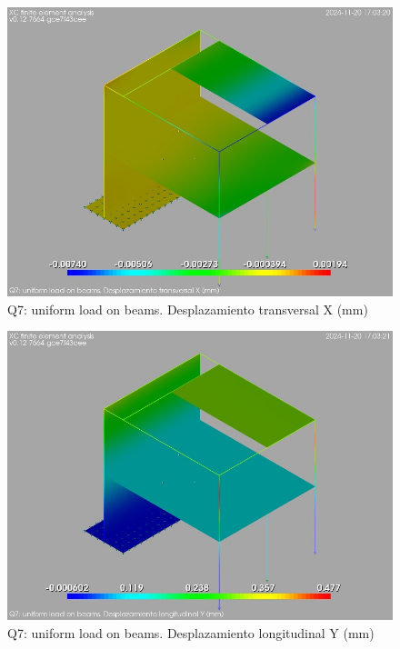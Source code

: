 \begin{figure}[ht]
\begin{center}
\includegraphics[width=\linewidth]{results/graphics/resSimplLC/qunifBeamsuX.png}
\caption{Q7: uniform load on beams. Desplazamiento transversal X (mm)}
\label{qunifBeamsuX}
\end{center}
\end{figure}
\begin{figure}[ht]
\begin{center}
\includegraphics[width=\linewidth]{results/graphics/resSimplLC/qunifBeamsuY.png}
\caption{Q7: uniform load on beams. Desplazamiento longitudinal Y (mm)}
\label{qunifBeamsuY}
\end{center}
\end{figure}
